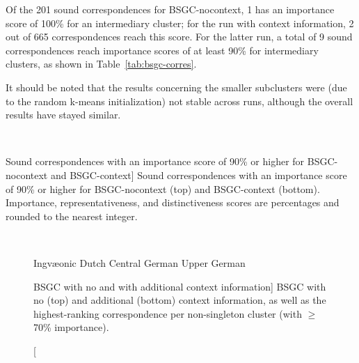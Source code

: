 \documentclass[a4paper]{article}
\def\upper{\color{purple}\FilledBigTriangleUp}
\def\central{\color{midblue}\FilledBigSquare}
\def\dutch{\color{green}\FilledBigCircle}
\def\ingv{\color{green}\BigCircle}
\begin{document}
Of the 201 sound correspondences for BSGC-nocontext,
1 has an importance score of 100\% for an intermediary cluster;
for the run with context information, 2 out of 665 correspondences reach this score.
For the latter run, a total of 9 sound correspondences
reach importance scores of at least 90\%
for intermediary clusters, as shown in Table~\ref{tab:bsgc-corres}.

It should be noted that the results concerning
the smaller subclusters were
(due to the random k-means initialization) not stable
across runs, although the overall results have stayed similar.

\begin{table}[h]
\begin{adjustwidth}{-1cm}{-1cm}
\centering
\\
\vspace{1.5em}

\end{adjustwidth}
\caption
[Sound correspondences with an importance score
of 90\% or higher for BSGC-nocontext and BSGC-context]
{Sound correspondences with an importance score
of 90\% or higher for BSGC-nocontext (top) and BSGC-context (bottom).
Importance, representativeness, and distinctiveness scores are percentages
and rounded to the nearest integer.
}
\label{tab:bsgc-corres}
\end{table}

\begin{figure}[h]
\begin{adjustwidth}{-1.5cm}{-1cm}
\centering
\\
\vspace{1.5em}

\end{adjustwidth}

\vspace{0.5em}
\begin{center}
{\ingv} Ingv\ae{}onic \hspace{1em}
{\dutch} Dutch \hspace{1em}
{\central} Central German \hspace{1em}
{\upper} Upper German
\end{center}
\caption
[BSGC with no and with additional context information]
{BSGC with no (top) and additional (bottom) context information,
as well as the highest-ranking correspondence per non-singleton cluster
(with $\geq$70\% importance).}
\label{fig:bsgc-trees}
\end{figure}
\end{document}
